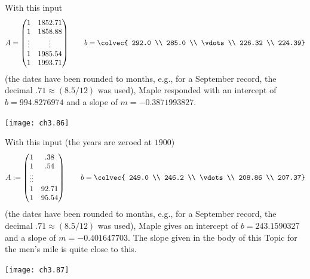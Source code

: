 \begin{ans}{2}
     With this input
     \begin{equation*}
       A =
       \begin{pmatrix}
           1 & 1852.71 \\
           1 & 1858.88 \\
          \vdots  &\vdots      \\
           1 & 1985.54 \\
           1 & 1993.71
        \end{pmatrix}
        \qquad
        b = \colvec{ 292.0 \\
                     285.0 \\
                    \vdots  \\
                     226.32 \\
                     224.39}
     \end{equation*}
     (the dates have been rounded to months, e.g., for a September record,
     the decimal $.71\approx (8.5/12)$ was used), Maple responded
     with an intercept of $b=994.8276974$ and a slope of
     $m=-0.3871993827$.
     \begin{center}  \small
        \texttt{[image: ch3.86]}
     \end{center}
     
\end{ans}
\begin{ans}{3}
   With this input (the years are zeroed at $1900$)
   \begin{equation*}
     A :=
     \begin{pmatrix}
        1 &   .38   \\
        1 &   .54   \\
       \vdots \vdots \\
        1 & 92.71 \\
        1 & 95.54
     \end{pmatrix}
     \qquad
     b = \colvec{ 249.0 \\
                  246.2 \\
                 \vdots \\
                  208.86 \\
                  207.37}
   \end{equation*}
     (the dates have been rounded to months, e.g., for a September record,
     the decimal $.71\approx (8.5/12)$ was used),
     Maple gives an intercept of $b=243.1590327$ and a slope of
   $m=-0.401647703$.
   The slope given in the body of this Topic for the men's mile is
   quite close to this.
   \begin{center}  \small
     \texttt{[image: ch3.87]}
   \end{center}
   
\end{ans}
